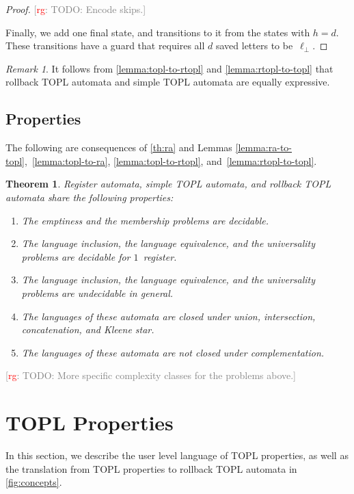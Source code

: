 \documentclass[9pt, preprint]{sigplanconf} %
\newcommand{\noterg}[2]{\textcolor{gray}{[\textcolor{red}{#1}: #2]}}
\newcommand{\rg}[1]{\noterg{rg}{#1}}
\newtheorem{theorem}{Theorem}
\theoremstyle{definition}
\theoremstyle{remark}
\newtheorem{remark}{Remark}
\begin{document}
\begin{proof}
\rg{TODO: Encode skips.}

\smallskip
Finally, we add one final state, and transitions to it from the states with $h=d$.
These transitions have a guard that requires all $d$ saved letters to be~$\ell_\bot$.
\end{proof}

\begin{remark}
It follows from \autoref{lemma:topl-to-rtopl} and \autoref{lemma:rtopl-to-topl} that rollback TOPL automata and simple TOPL automata are equally expressive.
\end{remark}

\subsection{Properties} %

The following are consequences of \autoref{th:ra} and Lemmas \ref{lemma:ra-to-topl},~\ref{lemma:topl-to-ra}, \ref{lemma:topl-to-rtopl}, and~\ref{lemma:rtopl-to-topl}.

\begin{theorem}\label{th:main}
Register automata, simple TOPL automata, and rollback TOPL automata share the following properties:
\begin{enumerate}
\item The emptiness and the membership problems are decidable.
\item The language inclusion, the language equivalence, and the universality problems are decidable for $1$~register.
\item The language inclusion, the language equivalence, and the universality problems are undecidable in general.
\item The languages of these automata are closed under union, intersection, concatenation, and Kleene star.
\item The languages of these automata are not closed under complementation.
\end{enumerate}
\end{theorem}
\rg{TODO: More specific complexity classes for the problems above.}

\section{TOPL Properties}\label{sec:topl} %

In this section, we describe the user level language of TOPL
properties, as well as the translation from TOPL properties to
rollback TOPL automata in \autoref{fig:concepts}.
\end{document}
